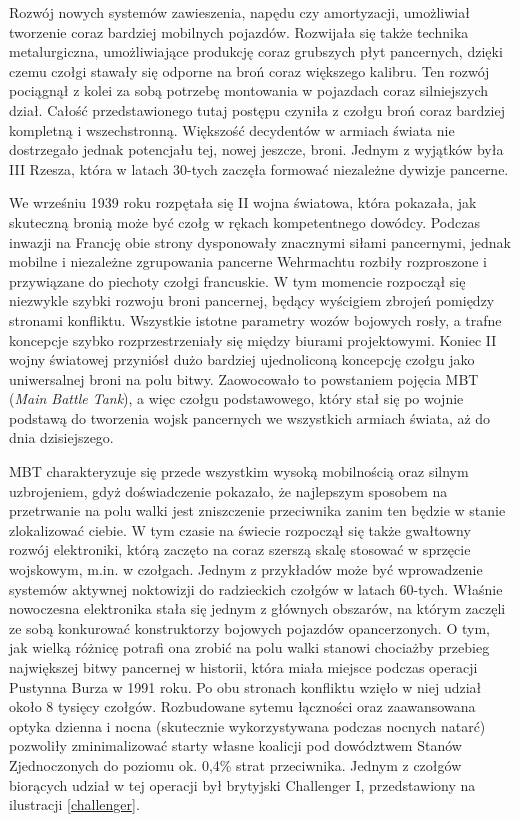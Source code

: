 Rozwój nowych systemów zawieszenia, napędu czy amortyzacji, umożliwiał tworzenie coraz bardziej mobilnych pojazdów. Rozwijała się także technika metalurgiczna, umożliwiające produkcję coraz grubszych płyt pancernych, dzięki czemu czołgi stawały się odporne na broń coraz większego kalibru. Ten rozwój pociągnął z kolei za sobą potrzebę montowania w pojazdach coraz silniejszych dział. Całość przedstawionego tutaj postępu czyniła z czołgu broń coraz bardziej kompletną i wszechstronną. Większość decydentów w armiach świata nie dostrzegało jednak potencjału tej, nowej jeszcze, broni. Jednym z wyjątków była III Rzesza, która w latach 30-tych zaczęła formować niezależne dywizje pancerne.

We wrześniu 1939 roku rozpętała się II wojna światowa, która pokazała, jak skuteczną bronią może być czołg w rękach kompetentnego dowódcy. Podczas inwazji na Francję obie strony dysponowały znacznymi siłami pancernymi, jednak mobilne i niezależne zgrupowania pancerne Wehrmachtu rozbiły rozproszone i przywiązane do piechoty czołgi francuskie. W tym momencie rozpoczął się niezwykle szybki rozwoju broni pancernej, będący wyścigiem zbrojeń pomiędzy stronami konfliktu. Wszystkie istotne parametry wozów bojowych rosły, a trafne koncepcje szybko rozprzestrzeniały się między biurami projektowymi. Koniec II wojny światowej przyniósł dużo bardziej ujednoliconą koncepcję czołgu jako uniwersalnej broni na polu bitwy. Zaowocowało to powstaniem pojęcia MBT (\textit{Main Battle Tank}), a więc czołgu podstawowego, który stał się po wojnie podstawą do tworzenia wojsk pancernych we wszystkich armiach świata, aż do dnia dzisiejszego.

MBT charakteryzuje się przede wszystkim wysoką mobilnością oraz silnym uzbrojeniem, gdyż doświadczenie pokazało, że najlepszym sposobem na przetrwanie na polu walki jest zniszczenie przeciwnika zanim ten będzie w stanie zlokalizować ciebie. W tym czasie na świecie rozpoczął się także gwałtowny rozwój elektroniki, którą zaczęto na coraz szerszą skalę stosować w sprzęcie wojskowym, m.in. w czołgach. Jednym z przykładów może być wprowadzenie systemów aktywnej noktowizji do radzieckich czołgów w latach 60-tych. Właśnie nowoczesna elektronika stała się jednym z głównych obszarów, na którym zaczęli ze sobą konkurować konstruktorzy bojowych pojazdów opancerzonych. O tym, jak wielką różnicę potrafi ona zrobić na polu walki stanowi chociażby przebieg największej bitwy pancernej w historii, która miała miejsce podczas operacji Pustynna Burza w 1991 roku. Po obu stronach konfliktu wzięło w niej udział około 8 tysięcy czołgów. Rozbudowane sytemu łączności oraz zaawansowana optyka dzienna i nocna (skutecznie wykorzystywana podczas nocnych natarć) pozwoliły zminimalizować starty własne koalicji pod dowództwem Stanów Zjednoczonych do poziomu ok. 0,4\% strat przeciwnika. Jednym z czołgów biorących udział w tej operacji był brytyjski Challenger I, przedstawiony na ilustracji \ref{challenger}.

